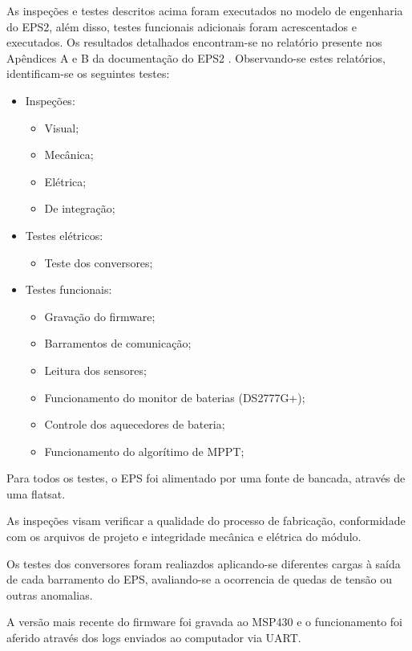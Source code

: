 As inspeções e testes descritos acima foram executados no modelo de engenharia do \gls{EPS2}, além disso, testes funcionais adicionais foram acrescentados e executados. Os resultados detalhados encontram-se no relatório presente nos Apêndices A e B da documentação do \gls{EPS2} \cite{eps2-doc}. Observando-se estes relatórios, identificam-se os seguintes testes:

\begin{itemize}
    \item Inspeções:
    \begin{itemize}
        \item Visual;
        \item Mecânica;
        \item Elétrica;
        \item De integração;
    \end{itemize}
    \item Testes elétricos:
    \begin{itemize}
        \item Teste dos conversores;
    \end{itemize}
    \item Testes funcionais:
    \begin{itemize}
        \item Gravação do firmware;
        \item Barramentos de comunicação;
        \item Leitura dos sensores;
        \item Funcionamento do monitor de baterias (DS2777G+);
        \item Controle dos aquecedores de bateria;
        \item Funcionamento do algorítimo de \gls{MPPT};
    \end{itemize}
\end{itemize}

Para todos os testes, o \gls{EPS} foi alimentado por uma fonte de bancada, através de uma flatsat.

As inspeções visam verificar a qualidade do processo de fabricação, conformidade com os arquivos de projeto e integridade mecânica e elétrica do módulo.

Os testes dos conversores foram realiazdos aplicando-se diferentes cargas à saída de cada barramento do \gls{EPS}, avaliando-se a ocorrencia de quedas de tensão ou outras anomalias.

A versão mais recente do firmware foi gravada ao MSP430 e o funcionamento foi aferido através dos logs enviados ao computador via \gls{UART}.

